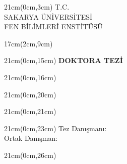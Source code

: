 \thispagestyle{empty}
\begingroup
\singlespacing
\setlength{\parskip}{0pt}

\begin{textblock*}{21cm}(0cm,3cm)
  \centering\fontsize{12}{14}\selectfont
  T.C.\\
  SAKARYA ÜNİVERSİTESİ\\
  FEN BİLİMLERİ ENSTİTÜSÜ
\end{textblock*}

\begin{textblock*}{17cm}(2cm,9cm)
  \centering\bfseries\fontsize{12}{14}\selectfont
  \TezBasligiKapak
\end{textblock*}

\begin{textblock*}{21cm}(0cm,15cm)
  \centering\bfseries\fontsize{12}{14}\selectfont DOKTORA TEZİ
\end{textblock*}

\begin{textblock*}{21cm}(0cm,16cm)
  \centering\fontsize{12}{14}\selectfont
  \TezYazari\\[3pt]
  \OgrenciNo
\end{textblock*}

\begin{textblock*}{21cm}(0cm,20cm)
  \centering\fontsize{12}{14}\selectfont \AnabilimDali
\end{textblock*}

\begin{textblock*}{21cm}(0cm,21cm)
  \centering\fontsize{12}{14}\selectfont \BilimDali
\end{textblock*}

\begin{textblock*}{21cm}(0cm,23cm)
  \centering\fontsize{12}{14}\selectfont
  Tez Danışmanı: \Danisman
  \if\relax\detokenize\expandafter{\OrtakDanisman}\relax\else\\Ortak Danışman: \OrtakDanisman\fi
\end{textblock*}

\begin{textblock*}{21cm}(0cm,26cm)
  \centering\fontsize{12}{14}\selectfont \TeslimTarihi
\end{textblock*}

\null
\endgroup

